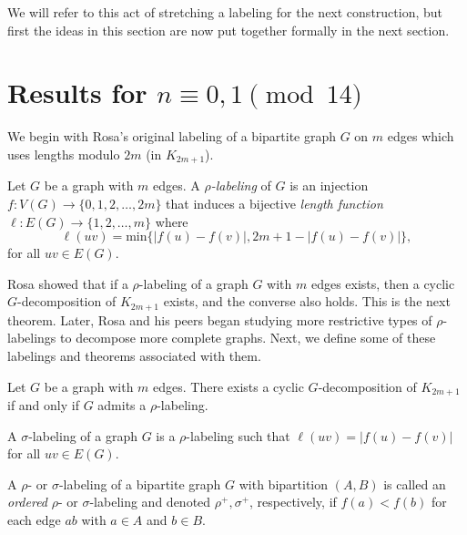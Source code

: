   We will refer to this act of stretching a labeling for the next construction, but first the ideas in this section are now put together formally in the next section.
\section{Results for $n\equiv 0,1 \pmod{14}$}\label{sec:0,1results}

We begin with Rosa's original labeling of a bipartite graph $G$ on $m$ edges which uses lengths modulo $2m$ (in $K_{2m+1}$). 

\begin{definition} \label{def:rho} 
 Let $G$ be a graph with $m$ edges.  A \textit{$\rho$-labeling} of $G$ is an injection $f: V(G) \rightarrow \{0,1,2, \dots, 2m\}$ that induces a bijective \textit{length function $\ell: E(G) \rightarrow \{1,2, \dots, m\}$} where 
    $$
    \ell(uv) = \text{min}\{|f(u)-f(v)|,2m+1-|f(u)-f(v)|\},
    $$
for all  $uv \in E(G)$.
\end{definition}

Rosa showed that if a $\rho$-labeling of a graph $G$ with $m$ edges exists, then a cyclic $G$-decomposition of $K_{2m+1}$ exists, and the converse also holds. This is the next theorem. Later, Rosa and his peers began studying more restrictive types of $\rho$-labelings to decompose more complete graphs. Next, we define some of these labelings and theorems associated with them.

\begin{thm}\label{thm:Rhosa}  
Let $G$ be a graph with $m$ edges.  There exists a cyclic $G$-decomposition of $K_{2m+1}$ if and only if $G$ admits a $\rho$-labeling.
\end{thm}

\begin{definition} \label{def:sigma} 
A $\sigma$-labeling of a graph $G$ is a $\rho$-labeling such that $\ell(uv) = |f(u) - f(v)|$ for all $uv \in E(G).$
\end{definition}

\begin{definition} \label{def:rho and sigma ordered def} 
A $\rho$- or $\sigma$-labeling of a bipartite graph $G$ with bipartition $(A,B)$ is called an \emph{ordered} $\rho$- or $\sigma$-labeling and denoted $\rho^+,\sigma^+$, respectively, if $f(a) < f(b)$ for each edge $ab$ with $a \in A$ and $b \in B$.
\end{definition}

